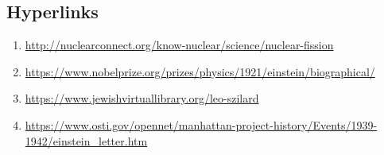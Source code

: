 \documentclass[12pt]{article}
\begin{document}
\subsection*{Hyperlinks}
\begin{enumerate}
    \item{\url{http://nuclearconnect.org/know-nuclear/science/nuclear-fission}}
    \item{\url{https://www.nobelprize.org/prizes/physics/1921/einstein/biographical/}}
    \item{\url{https://www.jewishvirtuallibrary.org/leo-szilard}}
    \item{\url{https://www.osti.gov/opennet/manhattan-project-history/Events/1939-1942/einstein_letter.htm}}
\end{enumerate}
\end{document}
